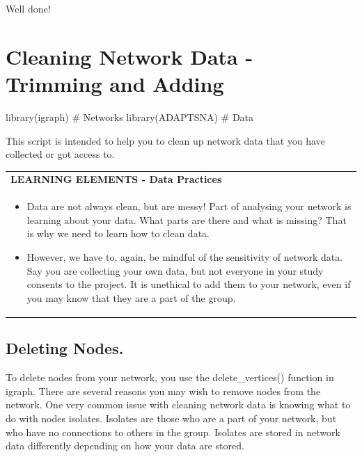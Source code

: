 \documentclass[
  letterpaper,
  DIV=11,
  numbers=noendperiod]{scrreprt}
\newenvironment{Shaded}{\begin{snugshade}}{\end{snugshade}}
\newcommand{\CommentTok}[1]{\textcolor[rgb]{0.37,0.37,0.37}{#1}}
\newcommand{\FunctionTok}[1]{\textcolor[rgb]{0.28,0.35,0.67}{#1}}
\newcommand{\NormalTok}[1]{\textcolor[rgb]{0.00,0.23,0.31}{#1}}
\providecommand{\tightlist}{%
  \setlength{\itemsep}{0pt}\setlength{\parskip}{0pt}}\usepackage{longtable,booktabs,array}
\begin{document}
Well done!

\chapter{Cleaning Network Data - Trimming and
Adding}\label{cleaning-network-data---trimming-and-adding}

\begin{Shaded}
\begin{Highlighting}[]
\FunctionTok{library}\NormalTok{(igraph) }\CommentTok{\# Networks}
\FunctionTok{library}\NormalTok{(ADAPTSNA) }\CommentTok{\# Data}
\end{Highlighting}
\end{Shaded}

This script is intended to help you to clean up network data that you
have collected or got access to.

\begin{longtable}[]{@{}
  >{\raggedright\arraybackslash}p{}@{}}
\toprule\noalign{}
\endhead
\bottomrule\noalign{}
\endlastfoot
\textbf{LEARNING ELEMENTS - Data Practices} \\
\begin{minipage}[t]{\linewidth}\raggedright
\begin{itemize}
\tightlist
\item
  Data are not always clean, but are messy! Part of analysing your
  network is learning about your data. What parts are there and what is
  missing? That is why we need to learn how to clean data.
\item
  However, we have to, again, be mindful of the sensitivity of network
  data. Say you are collecting your own data, but not everyone in your
  study consents to the project. It is unethical to add them to your
  network, even if you may know that they are a part of the group.
\end{itemize}
\end{minipage} \\
\end{longtable}

\section{Deleting Nodes.}\label{deleting-nodes.}

To delete nodes from your network, you use the delete\_vertices()
function in igraph. There are several reasons you may wish to remove
nodes from the network. One very common issue with cleaning network data
is knowing what to do with nodes isolates. Isolates are those who are a
part of your network, but who have no connections to others in the
group. Isolates are stored in network data differently depending on how
your data are stored.
\end{document}

